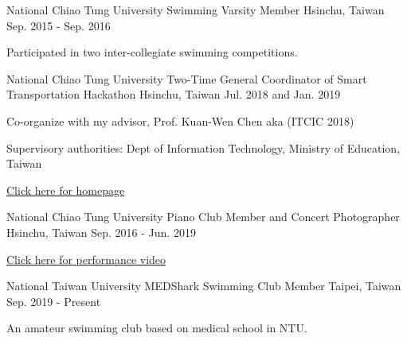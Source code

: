 

\begin{cventries}

\cventry
    {National Chiao Tung University} %
    {Swimming Varsity Member} %
    {Hsinchu, Taiwan} %
    {Sep. 2015 - Sep. 2016} %
    {
      \begin{cvitems} %
        \item {Participated in two inter-collegiate swimming competitions.}
      \end{cvitems}
    }

\cventry
    {National Chiao Tung University} %
    {Two-Time General Coordinator of Smart Transportation Hackathon} %
    {Hsinchu, Taiwan} %
    {Jul. 2018 and Jan. 2019} %
    {
      \begin{cvitems} %
        \item {Co-organize with my advisor, Prof. Kuan-Wen Chen aka (ITCIC 2018)}
        \item {Supervisory authorities: Dept of Information Technology, Ministry of Education, Taiwan}
        \item \href{http://covis.cs.nctu.edu.tw/ITCIC2018/}{Click here for homepage}
      \end{cvitems}
    }

\cventry
    {National Chiao Tung University} %
    {Piano Club Member and Concert Photographer} %
    {Hsinchu, Taiwan} %
    {Sep. 2016 - Jun. 2019} %
    {
      \begin{cvitems} %
        \item \href{https://www.youtube.com/watch?v=3xeSBrs6m5w&t=2s}
        {Click 
        here for performance video}
      \end{cvitems}
    }
\cventry
    {National Taiwan University} %
    {MEDShark Swimming Club Member} %
    {Taipei, Taiwan} %
    {Sep. 2019 - Present} %
    {
      \begin{cvitems} %
        \item {An amateur swimming club based on medical school in NTU.}
      \end{cvitems}
    }
\end{cventries}
